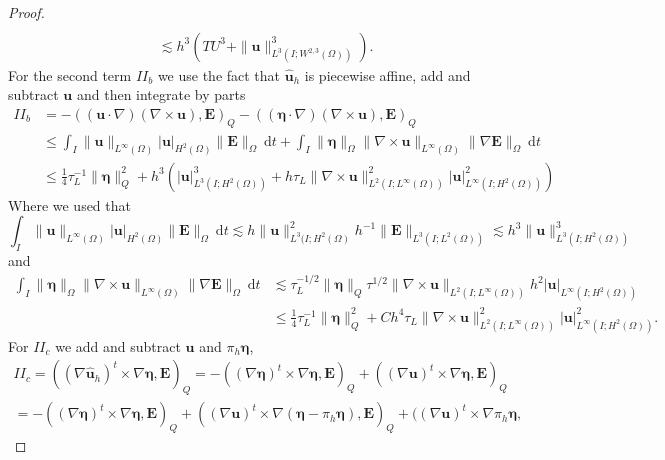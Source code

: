 \documentclass[10pt]{amsart}
\numberwithin{equation}{section}
\theoremstyle{definition}
\theoremstyle{remark}
\renewcommand{\(}{\bigl(}
\renewcommand{\)}{\bigr)}
\newcommand{\bld}[1]{\boldsymbol{#1}}
\newcommand{\bu}{\bld{u}}
\newcommand{\bhu}{\hat{\bld{u}}}
\newcommand{\bE}{\bld{E}}
\newcommand{\bldeta}{\bld{\eta}}
\newcommand{\bPi}{\bld{\Pi}}
\begin{document}
\begin{proof}
\begin{align*}
\\
&\lesssim h^3(T U^3 +\|\bu\|^3_{L^3(I;W^{2,3}(\Omega))}).
\end{align*}
For the second term $II_b$ 
we use the fact that $\bhu_h$ is piecewise affine, add and subtract $\bu$ and then integrate by parts
\begin{align*}
II_b &= - ((\bu \cdot \nabla) (\nabla \times \bu) ,
\bE)_Q- ((\bldeta \cdot \nabla) (\nabla \times \bu) ,
\bE)_Q 
\\
&\leq \int_I \|\bu\|_{L^\infty(\Omega)}  |
\bu|_{H^2(\Omega)} \|\bE\|_{\Omega} ~\mbox{d}t + \int_I\|\bldeta\|_\Omega  \|\nabla \times
\bu\|_{L^\infty(\Omega)} \|\nabla \bE\|_{\Omega}~\mbox{d}t
\\
&\leq   \frac14 \tau_L^{-1} \|\bldeta\|_Q^2
+  h^3 (|\bu|^3_{L^3(I;H^2(\Omega))} +h \tau_L  \|\nabla \times
\bu\|^2_{L^2(I;L^\infty(\Omega))}  |\bu|^2_{L^{\infty}(I;H^2(\Omega))} )
\end{align*}
Where we used that
\[
\int_I \|\bu\|_{L^\infty(\Omega)}  |
\bu|_{H^2(\Omega)} \|\bE\|_{\Omega} ~\mbox{d}t \lesssim h \|
\bu\|^2_{L^3(I; H^2(\Omega)} h^{-1} \|\bE\|_{L^3(I;L^2(\Omega))}
\lesssim h^3 \|\bu\|^3_{L^3(I;H^2(\Omega))}
\]
and
\begin{align*}
\int_I\|\bldeta\|_\Omega  \|\nabla \times
\bu\|_{L^\infty(\Omega)} \|\nabla \bE\|_{\Omega}~\mbox{d}t
&\lesssim
\tau_L^{-1/2} \|\bldeta\|_Q \tau^{1/2}  \|\nabla \times
\bu\|_{L^2(I;L^\infty(\Omega))} h^2 |\bu|_{L^{\infty}(I;H^2(\Omega))}
\\
&\leq 
\frac14 \tau_L^{-1} \|\bldeta\|_Q^2 + C h^4 \tau_L  \|\nabla \times
\bu\|^2_{L^2(I;L^\infty(\Omega))}  |\bu|^2_{L^{\infty}(I;H^2(\Omega))} .
\end{align*}
For $II_c$ we add and subtract $\bu$ and $\pi_h \bldeta$, 
\begin{multline}
II_c = ((\nabla \bhu_h)^t \times \nabla \bldeta,
\bE)_Q = - ((\nabla \bldeta)^t \times \nabla \bldeta ,
\bE)_Q + ((\nabla \bu)^t \times \nabla \bldeta,
\bE)_Q \\
= - ((\nabla \bldeta)^t \times \nabla \bldeta ,
\bE)_Q + ((\nabla \bu)^t \times \nabla (\bldeta - \pi_h \bldeta) ,
\bE)_Q + ((\nabla \bu)^t \times  \nabla \pi_h \bldeta ,

\end{multline}
\end{proof}
\end{document}
